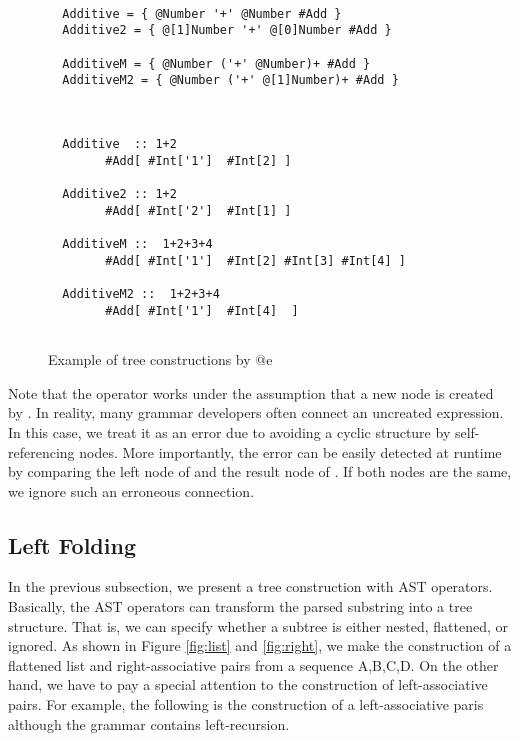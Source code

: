 \documentclass[JIP]{ipsj}
\begin{document}
\begin{figure}[tb]

{\small \begin{framed} \begin{verbatim}

  Additive = { @Number '+' @Number #Add }
  Additive2 = { @[1]Number '+' @[0]Number #Add }

  AdditiveM = { @Number ('+' @Number)+ #Add }
  AdditiveM2 = { @Number ('+' @[1]Number)+ #Add }
  
\end{verbatim}\end{framed}}

{\small \begin{verbatim}

  Additive  :: 1+2
        #Add[ #Int['1']  #Int[2] ]

  Additive2 :: 1+2
        #Add[ #Int['2']  #Int[1] ]

  AdditiveM ::  1+2+3+4
        #Add[ #Int['1']  #Int[2] #Int[3] #Int[4] ]

  AdditiveM2 ::  1+2+3+4
        #Add[ #Int['1']  #Int[4]  ]
  
\end{verbatim}}

\caption{Example of tree constructions by @e}
\label{fig:tree}
\end{figure}

Note that the  operator works under the assumption that a new node is created by . In reality, many grammar developers often connect an uncreated expression. In this case, we treat it as an error due to avoiding a cyclic structure by self-referencing nodes. More importantly, the error can be easily detected at runtime by comparing the left node of  and the result node of . If both nodes are the same, we ignore such an erroneous connection. 

\subsection{Left Folding}

In the previous subsection, we present a tree construction with AST operators. Basically, the AST operators can transform the parsed substring into a tree structure. That is, we can specify whether a subtree is either nested, flattened, or ignored. As shown in Figure \ref{fig:list} and \ref{fig:right}, we make the construction of a flattened list and right-associative pairs from a sequence A,B,C,D. On the other hand, we have to pay a special attention to the construction of left-associative pairs. For example, the following is the construction of a left-associative paris although the grammar contains left-recursion.
\end{document}
